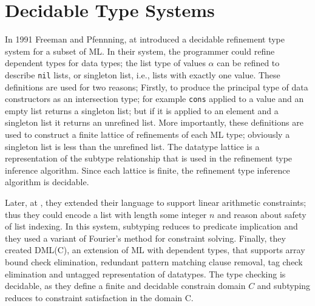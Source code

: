 	\newcommand\qset{\ensuremath{\mathbb{Q}}}
\newcommand\NV[1]{\columnbreak}


\section{Decidable Type Systems}

In 1991 Freeman and Pfennning, at \cite{FreemanPfenning91} introduced
a decidable refinement type system for a subset of ML.
%
In their system, the programmer could refine dependent
types for data types; 
the list type of values $\alpha$ can be refined to 
describe \texttt{nil} lists, or singleton list, i.e., lists
with exactly one value.
%
These definitions are used for two reasons;
Firstly, to produce the principal type of 
data constructors as an intersection type;
for example \texttt{cons} applied to a value and an empty
list returns a singleton list; but if it is applied
to an element and a singleton list it returns an unrefined list.
More importantly, these definitions are used to 
construct a finite lattice of refinements of each ML type; 
obviously a singleton list is less than the unrefined list.
%
The datatype lattice is a representation of the subtype
relationship that is used in the 
refinement type inference algorithm. 
Since each lattice is finite, the refinement type
inference algorithm is decidable.

Later, at \cite{pfenningxi98}, 
they extended their language to support
linear arithmetic constraints; thus they could
encode a list with length some integer $n$ and 
reason about safety of list indexing.
In this system, subtyping reduces to predicate implication
and they used a variant of Fourier's method \cite{OmegaTestCACM} 
for constraint solving.
%
Finally, they created DML(C)\cite{XiPfenning99}, 
an extension of ML with dependent types, that supports 
array bound check elimination,
redundant pattern matching clause removal, 
tag check elimination and untagged representation of datatypes.
The type checking is decidable, as they define a finite and decidable
constrain domain $C$ and subtyping reduces to constraint satisfaction in the 
domain C.
%

